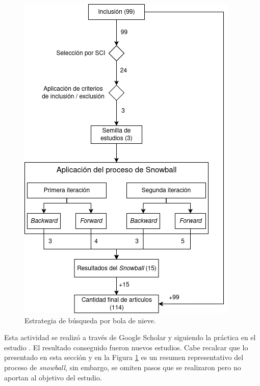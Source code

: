 \begin{figure}[htbp]
	\centering
	\includegraphics[scale=0.55]{resources/figures/sms-Snowball.drawio.png}
	\caption{Estrategia de búsqueda por bola de nieve.}
	\label{figure:Snowball}
\end{figure}

Esta actividad se realizó a través de Google Scholar y siguiendo la práctica en el estudio \cite{Ali-01}. El resultado conseguido fueron \snowballNewStudies{} nuevos estudios. Cabe recalcar que lo presentado en esta sección y en la Figura \ref{figure:Snowball} es un resumen representativo del proceso de \textit{snowball}, sin embargo, se omiten pasos que se realizaron pero no aportan al objetivo del estudio.

